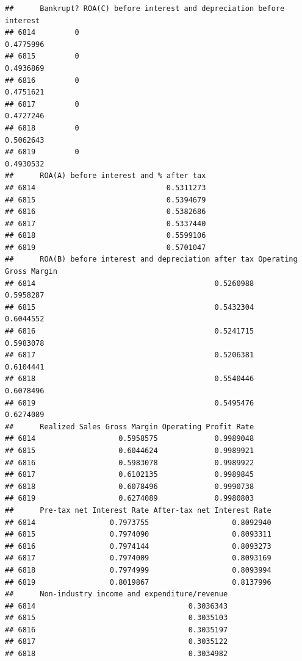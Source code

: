 \documentclass[
]{book}
\begin{document}
\begin{verbatim}
##      Bankrupt? ROA(C) before interest and depreciation before interest
## 6814         0                                               0.4775996
## 6815         0                                               0.4936869
## 6816         0                                               0.4751621
## 6817         0                                               0.4727246
## 6818         0                                               0.5062643
## 6819         0                                               0.4930532
##      ROA(A) before interest and % after tax
## 6814                              0.5311273
## 6815                              0.5394679
## 6816                              0.5382686
## 6817                              0.5337440
## 6818                              0.5599106
## 6819                              0.5701047
##      ROA(B) before interest and depreciation after tax Operating Gross Margin
## 6814                                         0.5260988              0.5958287
## 6815                                         0.5432304              0.6044552
## 6816                                         0.5241715              0.5983078
## 6817                                         0.5206381              0.6104441
## 6818                                         0.5540446              0.6078496
## 6819                                         0.5495476              0.6274089
##      Realized Sales Gross Margin Operating Profit Rate
## 6814                   0.5958575             0.9989048
## 6815                   0.6044624             0.9989921
## 6816                   0.5983078             0.9989922
## 6817                   0.6102135             0.9989845
## 6818                   0.6078496             0.9990738
## 6819                   0.6274089             0.9980803
##      Pre-tax net Interest Rate After-tax net Interest Rate
## 6814                 0.7973755                   0.8092940
## 6815                 0.7974090                   0.8093311
## 6816                 0.7974144                   0.8093273
## 6817                 0.7974009                   0.8093169
## 6818                 0.7974999                   0.8093994
## 6819                 0.8019867                   0.8137996
##      Non-industry income and expenditure/revenue
## 6814                                   0.3036343
## 6815                                   0.3035103
## 6816                                   0.3035197
## 6817                                   0.3035122
## 6818                                   0.3034982

\end{verbatim}
\end{document}
